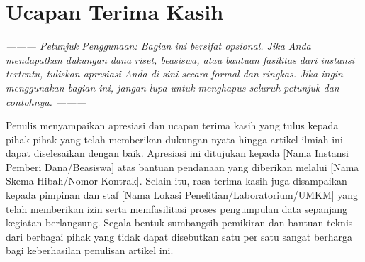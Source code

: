 \section*{Ucapan Terima Kasih}

\textit{--------- Petunjuk Penggunaan: Bagian ini bersifat opsional. Jika Anda mendapatkan dukungan dana riset, beasiswa, atau bantuan fasilitas dari instansi tertentu, tuliskan apresiasi Anda di sini secara formal dan ringkas. Jika ingin menggunakan bagian ini, jangan lupa untuk menghapus seluruh petunjuk dan contohnya. ---------}

Penulis menyampaikan apresiasi dan ucapan terima kasih yang tulus kepada pihak-pihak yang telah memberikan dukungan nyata hingga artikel ilmiah ini dapat diselesaikan dengan baik. Apresiasi ini ditujukan kepada [Nama Instansi Pemberi Dana/Beasiswa] atas bantuan pendanaan yang diberikan melalui [Nama Skema Hibah/Nomor Kontrak]. Selain itu, rasa terima kasih juga disampaikan kepada pimpinan dan staf [Nama Lokasi Penelitian/Laboratorium/UMKM] yang telah memberikan izin serta memfasilitasi proses pengumpulan data sepanjang kegiatan berlangsung. Segala bentuk sumbangsih pemikiran dan bantuan teknis dari berbagai pihak yang tidak dapat disebutkan satu per satu sangat berharga bagi keberhasilan penulisan artikel ini.